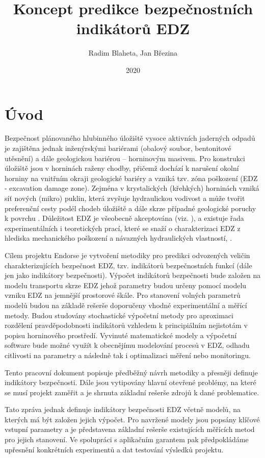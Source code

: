 \documentclass{article}
\title{Koncept predikce bezpečnostních indikátorů EDZ}
\author{Radim Blaheta, Jan Březina}
\date{2020}
\begin{document}
\maketitle


\section{Úvod}
Bezpečnost plánovaného hlubinného úložiště vysoce aktivních jaderných odpadů je zajištěna 
jednak inženýrskými bariérami (obalový soubor, bentonitové utěsnění) a dále geologickou bariérou 
– horninovým masivem. Pro konstrukci úložiště jsou v horninách raženy chodby, přičemž dochází 
k narušení okolní horniny na vnitřním okraji geologické bariéry a vzniká tzv. zóna poškození 
(EDZ - excavation damage zone). 
Zejména v krystalických (křehkých) horninách vzniká síť nových (mikro) puklin, která zvyšuje 
hydraulickou vodivost a může tvořit preferenční cesty podél 
chodeb úložiště a dále skrze případné geologické poruchy k povrchu .
Důležitost EDZ je všeobecně
akceptována (viz. \cite{Pusch2008}), a existuje řada experimentálních i teoretických prací, které se snaží o charakterizaci EDZ z hlediska mechanického poškození a návazných hydraulických vlastností, \cite{Vavro2016}.

Cílem projektu Endorse je vytvoření metodiky pro predikci odvozených veličin charakterizujících 
bezpečnost EDZ, tzv. indikátorů bezpečnostních funkcí (dále jen jako indikátory bezpečnosti).
Výpočet indikátorů bezpečnosti bude založen na modelu transportu skrze EDZ 
jehož parametry budou určeny pomocí modelu vzniku EDZ na jemnější prostorové škále. 
Pro stanovení volných parametrů modelů budou na základě rešerše doporučeny vhodné experimentální a měřící metody.
Budou studovány stochastické výpočetní metody pro aproximaci rozdělení pravděpodobnosti indikátorů
vzhledem k principiálním nejistotám v popisu horninového prostředí.
Vyvinuté matematickcé modely a výpočetní software bude možné využít k obecnějímu modelování procesů 
v EDZ, odhadu citlivosti na parametry a následně tak i optimalizaci měření nebo monitoringu.



Tento pracovní dokument popisuje předběžný návrh metodiky a přesněji definuje indikátory 
bezpečnosti. Dále jsou vytipovány hlavní otevřené problémy, na které se musí projekt zaměřit a je 
shrnuta základní rešerše zdrojů k dané problematice. 




Tato zpráva jednak definuje indikátory bezpečnosti EDZ včetně modelů, na kterých 
má být založen jejich výpočet. Pro navržené modely jsou popsány klíčové vstupní 
parametry a je představena základní rešerše existujících měřících metod pro jejich
stanovení. Ve spolupráci s aplikačním garantem pak předpokládáme upřesnění konkrétních experimentů
a dat testování výsledků projektu. 
\end{document}
